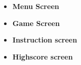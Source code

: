	\begin{itemize}
		\item {\bf Menu Screen}
		\item {\bf Game Screen}
		\item {\bf Instruction screen}
		\item {\bf Highscore screen}
	\end{itemize}
	\begin{figure}[H]
	\centering
\end{figure}

